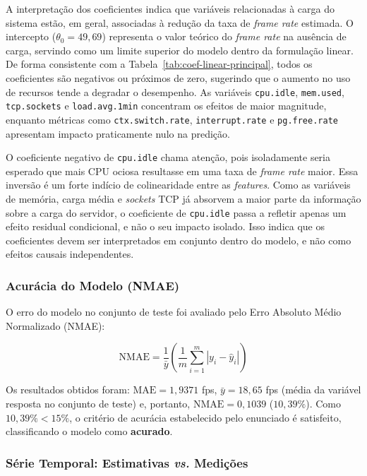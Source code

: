 \documentclass[11pt,a4paper]{article}
\begin{document}
A interpretação dos coeficientes indica que variáveis relacionadas à carga do sistema estão, em geral, associadas à redução da taxa de \emph{frame rate} estimada. O intercepto ($\theta_0 = 49{,}69$) representa o valor teórico do \emph{frame rate} na ausência de carga, servindo como um limite superior do modelo dentro da formulação linear. De forma consistente com a Tabela~\ref{tab:coef-linear-principal}, todos os coeficientes são negativos ou próximos de zero, sugerindo que o aumento no uso de recursos tende a degradar o desempenho. As variáveis \texttt{cpu.idle}, \texttt{mem.used}, \texttt{tcp.sockets} e \texttt{load.avg.1min} concentram os efeitos de maior magnitude, enquanto métricas como \texttt{ctx.switch.rate}, \texttt{interrupt.rate} e \texttt{pg.free.rate} apresentam impacto praticamente nulo na predição.

O coeficiente negativo de \texttt{cpu.idle} chama atenção, pois isoladamente seria esperado que mais CPU ociosa resultasse em uma taxa de \emph{frame rate} maior. Essa inversão é um forte indício de colinearidade entre as \emph{features}. Como as variáveis de memória, carga média e \emph{sockets} TCP já absorvem a maior parte da informação sobre a carga do servidor, o coeficiente de \texttt{cpu.idle} passa a refletir apenas um efeito residual condicional, e não o seu impacto isolado. Isso indica que os coeficientes devem ser interpretados em conjunto dentro do modelo, e não como efeitos causais independentes.


\subsubsection{Acurácia do Modelo (NMAE)}

O erro do modelo no conjunto de teste foi avaliado pelo Erro Absoluto Médio Normalizado (NMAE):

\begin{equation}
    \text{NMAE} = \frac{1}{\bar{y}} \left( \frac{1}{m} \sum_{i=1}^{m} \left| y_i - \hat{y}_i \right| \right)
\end{equation}

Os resultados obtidos foram: $\text{MAE} = 1{,}9371$ fps, $\bar{y} = 18{,}65$ fps (média da variável resposta no conjunto de teste) e, portanto, $\text{NMAE} = 0{,}1039$ ($10{,}39\%$). Como $10{,}39\% < 15\%$, o critério de acurácia estabelecido pelo enunciado é satisfeito, classificando o modelo como \textbf{acurado}.

\subsubsection{Série Temporal: Estimativas \emph{vs.} Medições}
\end{document}
